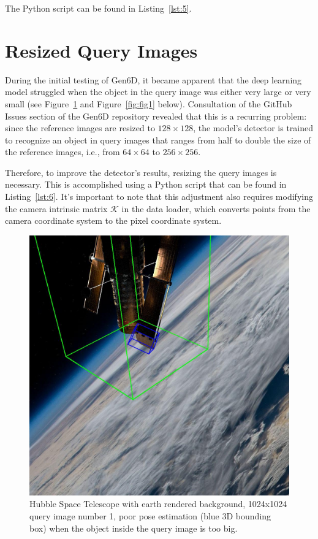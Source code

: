 \noindent The Python script can be found in Listing~\ref{lst:5}.

\section{Resized Query Images}

During the initial testing of Gen6D, it became apparent that the deep learning model struggled when the object in the query image was either very large or very small (see Figure~\ref{fig:fig2} and Figure~\ref{fig:fig1} below). Consultation of the GitHub Issues section of the Gen6D repository revealed that this is a recurring problem: since the reference images are resized to $128\times 128$, the model's detector is trained to recognize an object in query images that ranges from half to double the size of the reference images, i.e., from $64\times 64$ to $256\times 256$.

\bigskip

Therefore, to improve the detector's results, resizing the query images is necessary. This is accomplished using a Python script that can be found in Listing~\ref{lst:6}. It's important to note that this adjustment also requires modifying the camera intrinsic matrix $\bm{\mathcal{K}}$ in the data loader, which converts points from the camera coordinate system to the pixel coordinate system.

\begin{figure}[h]
    \centering
    \includegraphics[width=0.70\linewidth]{data/fig2.jpg} %
    \caption{Hubble Space Telescope with earth rendered background, 1024x1024 query image number 1, poor pose estimation (blue 3D bounding box) when the object inside the query image is too big.}
    \label{fig:fig2}
\end{figure}

